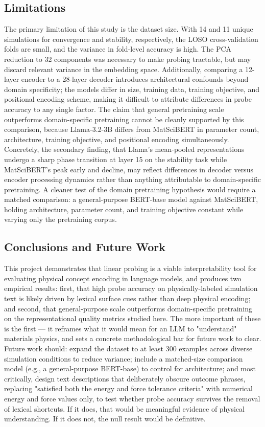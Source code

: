 \documentclass[11pt]{article}
\begin{document}
\subsection{Limitations}

The primary limitation of this study is the dataset size. With 14 and 11 unique simulations for convergence and stability, respectively, the LOSO cross-validation folds are small, and the variance in fold-level accuracy is high. The PCA reduction to 32 components was necessary to make probing tractable, but may discard relevant variance in the embedding space. Additionally, comparing a 12-layer encoder to a 28-layer decoder introduces architectural confounds beyond domain specificity; the models differ in size, training data, training objective, and positional encoding scheme, making it difficult to attribute differences in probe accuracy to any single factor. The claim that general pretraining scale outperforms domain-specific pretraining cannot be cleanly supported by this comparison, because Llama-3.2-3B differs from MatSciBERT in parameter count, architecture, training objective, and positional encoding simultaneously. Concretely, the secondary finding, that Llama's mean-pooled representations undergo a sharp phase transition at layer 15 on the stability task while MatSciBERT's peak early and decline, may reflect differences in decoder versus encoder processing dynamics rather than anything attributable to domain-specific pretraining. A cleaner test of the domain pretraining hypothesis would require a matched comparison: a general-purpose BERT-base model against MatSciBERT, holding architecture, parameter count, and training objective constant while varying only the pretraining corpus.

\subsection{Conclusions and Future Work}

This project demonstrates that linear probing is a viable interpretability tool for evaluating physical concept encoding in language models, and produces two empirical results: first, that high probe accuracy on physically-labeled simulation text is likely driven by lexical surface cues rather than deep physical encoding; and second, that general-purpose scale outperforms domain-specific pretraining on the representational quality metrics studied here. The more important of these is the first — it reframes what it would mean for an LLM to "understand" materials physics, and sets a concrete methodological bar for future work to clear.
Future work should: expand the dataset to at least 300 examples across diverse simulation conditions to reduce variance; include a matched-size comparison model (e.g., a general-purpose BERT-base) to control for architecture; and most critically, design text descriptions that deliberately obscure outcome phrases, replacing "satisfied both the energy and force tolerance criteria" with numerical energy and force values only, to test whether probe accuracy survives the removal of lexical shortcuts. If it does, that would be meaningful evidence of physical understanding. If it does not, the null result would be definitive.
\end{document}
